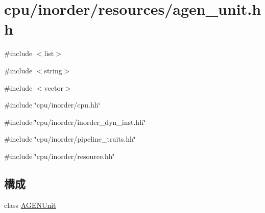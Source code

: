 \hypertarget{agen__unit_8hh}{
\section{cpu/inorder/resources/agen\_\-unit.hh}
\label{agen__unit_8hh}
}
{\ttfamily \#include $<$list$>$}\par
{\ttfamily \#include $<$string$>$}\par
{\ttfamily \#include $<$vector$>$}\par
{\ttfamily \#include \char`\"{}cpu/inorder/cpu.hh\char`\"{}}\par
{\ttfamily \#include \char`\"{}cpu/inorder/inorder\_\-dyn\_\-inst.hh\char`\"{}}\par
{\ttfamily \#include \char`\"{}cpu/inorder/pipeline\_\-traits.hh\char`\"{}}\par
{\ttfamily \#include \char`\"{}cpu/inorder/resource.hh\char`\"{}}\par
\subsection*{構成}
\begin{DoxyCompactItemize}
\item 
class \hyperlink{classAGENUnit}{AGENUnit}
\end{DoxyCompactItemize}
